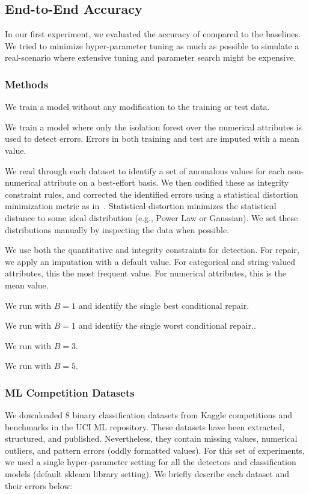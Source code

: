 \subsection{End-to-End Accuracy}
In our first experiment, we evaluated the accuracy of \sys compared to the baselines.
We tried to minimize hyper-parameter tuning as much as possible to simulate a real-scenario where extensive tuning and parameter search might be expensive.

\subsubsection{Methods}

 We train a model without any modification to the training or test data.

 We train a model where only the isolation forest over the numerical attributes is used to detect errors.
Errors in both training and test are imputed with a mean value.

 We read through each dataset to identify a set of anomalous values for each non-numerical attribute on a best-effort basis.  We then codified these as integrity constraint rules, and corrected the identified errors using a statistical distortion minimization metric as in~\cite{prokoshyna2015combining}. Statistical distortion minimizes the statistical distance to some ideal distribution (e.g., Power Law or Gaussian). We set these distributions manually by inspecting the data when possible.

 We use both the quantitative and integrity constraints for detection. For repair, we apply an imputation with a default value. For categorical and string-valued attributes, this the most frequent value. For numerical attributes, this is the mean value.

 We run \sys with $B=1$ and identify the  single best conditional repair.

 We run \sys with $B=1$ and identify the single worst conditional repair..

 We run \sys with $B=3$.

 We run \sys with $B=5$.

\subsubsection{ML Competition Datasets}\label{exp:comp}
We downloaded 8 binary classification datasets from Kaggle competitions and benchmarks in the UCI ML repository.  
These datasets have been extracted, structured, and published.
Nevertheless, they contain missing values, numerical outliers, and pattern errors (oddly formatted values).
For this set of experiments, we used a single hyper-parameter setting for all the detectors and classification models (default \textsf{sklearn} library setting). 
We briefly describe each dataset and their errors below:


